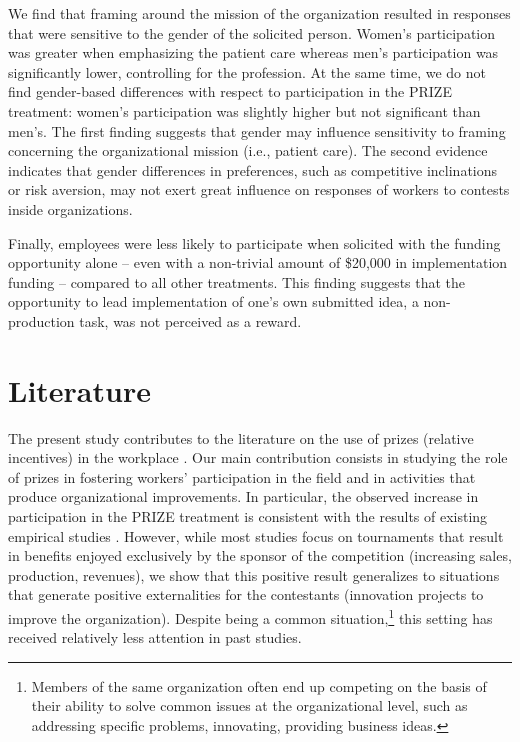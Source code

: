 \documentclass[11pt, titlepage]{article}
\begin{document}
We find that framing around the mission of the organization resulted in
responses that were sensitive to the gender of the solicited person.
Women's participation was greater when emphasizing the patient care
whereas men's participation was significantly lower, controlling for the
profession. At the same time, we do not find gender-based differences
with respect to participation in the PRIZE treatment: women's
participation was slightly higher but not significant than men's. The
first finding suggests that gender may influence sensitivity to framing
concerning the organizational mission (i.e., patient care). The second
evidence indicates that gender differences in preferences, such as
competitive inclinations or risk aversion, may not exert great influence
on responses of workers to contests inside organizations.

Finally, employees were less likely to participate when solicited with
the funding opportunity alone -- even with a non-trivial amount of
\$20,000 in implementation funding -- compared to all other treatments.
This finding suggests that the opportunity to lead implementation of
one's own submitted idea, a non-production task, was not perceived as a
reward.

\section{Literature}\label{literature}

The present study contributes to the literature on the use of prizes
(relative incentives) in the workplace \citep[among
others]{lazear1981rank, green1983comparison, mary1984economic}. Our main
contribution consists in studying the role of prizes in fostering
workers' participation in the field and in activities that produce
organizational improvements. In particular, the observed increase in
participation in the PRIZE treatment is consistent with the results of
existing empirical studies
\citep{bull1987tournaments, knoeber1994testing, eriksson1999executive, ehrenberg1990tournaments, terwiesch2008innovation, terwiesch2009innovation, boudreau2011incentives, boudreau2016performance}.
However, while most studies focus on tournaments that result in benefits
enjoyed exclusively by the sponsor of the competition (increasing sales,
production, revenues), we show that this positive result generalizes to
situations that generate positive externalities for the contestants
(innovation projects to improve the organization). Despite being a
common situation,\footnote{Members of the same organization often end up
  competing on the basis of their ability to solve common issues at the
  organizational level, such as addressing specific problems,
  innovating, providing business ideas.} this setting has received
relatively less attention in past studies.
\end{document}
